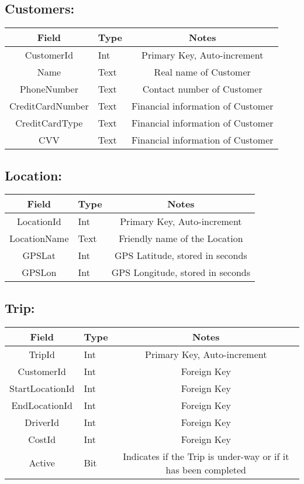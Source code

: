 \documentclass[10pt, onecolumn]{witseiepaper}
\begin{document}
\subsection*{Customers:}
\begin{tabular}{|c|l|c|}
\hline 
Field & Type & Notes\\ 
\hline 
CustomerId & Int & Primary Key, Auto-increment\\
\hline 
Name & Text & Real name of Customer\\
\hline
PhoneNumber & Text & Contact number of Customer\\
\hline
CreditCardNumber & Text & Financial information of Customer\\
\hline
CreditCardType & Text & Financial information of Customer\\
\hline
CVV & Text & Financial information of Customer\\
\hline
\end{tabular}

\subsection*{Location:}
\begin{tabular}{|c|l|c|}
\hline 
Field & Type & Notes\\ 
\hline 
LocationId & Int & Primary Key, Auto-increment\\
\hline 
LocationName & Text & Friendly name of the Location\\
\hline
GPSLat & Int & GPS Latitude, stored in seconds\\
\hline
GPSLon & Int & GPS Longitude, stored in seconds\\
\hline
\end{tabular}

\subsection*{Trip:}
\begin{tabular}{|c|l|c|}
\hline 
Field & Type & Notes\\ 
\hline 
TripId & Int & Primary Key, Auto-increment\\
\hline 
CustomerId & Int & Foreign Key\\
\hline 
StartLocationId & Int & Foreign Key\\
\hline 
EndLocationId & Int & Foreign Key\\
\hline 
DriverId & Int & Foreign Key\\
\hline 
CostId & Int & Foreign Key\\
\hline 
Active & Bit & Indicates if the Trip is under-way or if it has been completed\\
\hline
\end{tabular}

%



\end{document}

